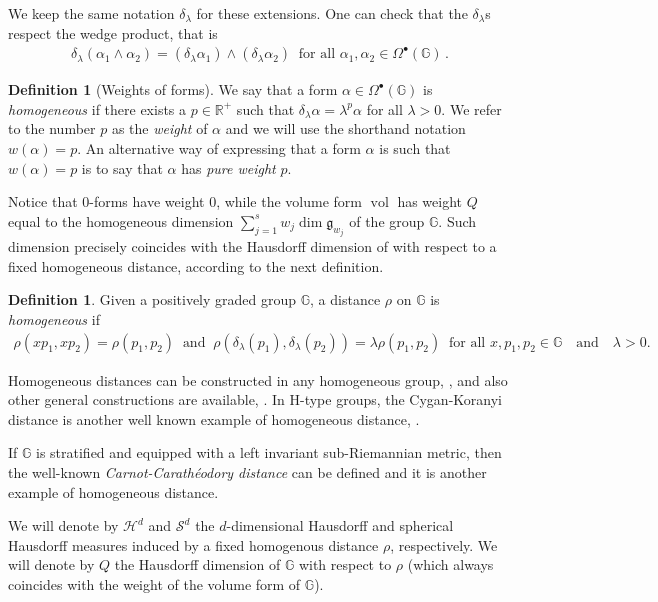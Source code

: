 \documentclass[dvipsnames]{amsart}
\theoremstyle{definition}
\newtheorem{definition}[theorem]{Definition}
\theoremstyle{definition}
\numberwithin{equation}{section}
\newcommand{\R}{\mathbb{R}}
\newcommand{\G}{\mathbb{G}}
\begin{document}
We keep the same notation $\delta_\lambda$ for these extensions. One can check that the $\delta_\lambda$s respect the wedge product, that is
\begin{align*}
    \delta_\lambda(\alpha_1\wedge\alpha_2)=(\delta_\lambda\alpha_1)\wedge(\delta_\lambda\alpha_2)\ \text{ for all }\alpha_1,\alpha_2\in\Omega^\bullet(\G)\,.
\end{align*}
\begin{definition}[Weights of forms]\label{def: weights of forms}
    We say that a form $\alpha\in\Omega^\bullet(\G)$ is \textit{homogeneous} if there exists a $p\in\R^+$ such that $\delta_\lambda\alpha=\lambda^p\alpha$ for all $\lambda>0$. We refer to the number $p$ as the \textit{weight} of $\alpha$ and we will use the shorthand notation $w(\alpha)=p$. An alternative way of expressing that a form $\alpha$ is such that $w(\alpha)=p$ is to say that $\alpha$ has \textit{pure weight }$p$. 
\end{definition}
Notice that 0-forms have weight $0$, while the volume form $\operatorname{vol}$ has weight $Q$ equal to the homogeneous dimension $\sum_{j=1}^sw_j\operatorname{dim}\mathfrak{g}_{w_j}$ of the group $\G$. Such dimension precisely coincides with the Hausdorff dimension of with respect to a fixed homogeneous distance, according to the next definition.

\begin{definition}
Given a positively graded group $\G$, a distance $\rho$ on $\G$ is {\em homogeneous} if 
\begin{align*}
    \rho(xp_1,xp_2)=\rho(p_1,p_2)\ \text{ and }\ \rho(\delta_\lambda(p_1),\delta_\lambda(p_2))=\lambda\rho(p_1,p_2)\ \text{ for all }x,p_1,p_2\in\G\quad \text{and}\quad\lambda>0.
\end{align*}
\end{definition}
Homogeneous distances can be constructed in any homogeneous group, \cite{HebSik90}, and also other general constructions are available, \cite{FSSC5}. In H-type groups, the Cygan-Koranyi distance is another well known example of homogeneous distance, \cite{Cygan81}.

If $\G$ is stratified and equipped with a left invariant sub-Riemannian metric, then the well-known {\em Carnot-Carath\'eodory distance} can be defined and it is another example of homogeneous distance.

 We will denote by $\mathcal{H}^d$ and $\mathcal{S}^d$ the $d$-dimensional Hausdorff and spherical Hausdorff measures induced by a fixed homogenous distance $\rho$, respectively. We will denote by $Q$ the Hausdorff dimension of $\G$ with respect to $\rho$ (which always coincides with the weight of the volume form of $\G$).
\end{document}
